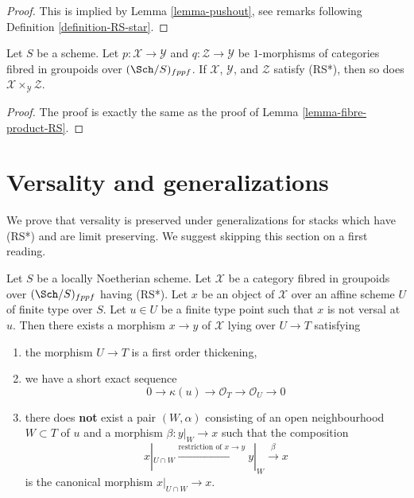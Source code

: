\begin{proof}
This is implied by Lemma \ref{lemma-pushout}, see
remarks following Definition \ref{definition-RS-star}.
\end{proof}

\begin{lemma}
\label{lemma-fibre-product-RS-star}
Let $S$ be a scheme. Let $p : \mathcal{X} \to \mathcal{Y}$ and
$q : \mathcal{Z} \to \mathcal{Y}$ be $1$-morphisms of categories
fibred in groupoids over $(\Sch/S)_{fppf}$. If $\mathcal{X}$, $\mathcal{Y}$,
and $\mathcal{Z}$ satisfy (RS*), then so
does $\mathcal{X} \times_\mathcal{Y} \mathcal{Z}$.
\end{lemma}

\begin{proof}
The proof is exactly the same as the proof of
Lemma \ref{lemma-fibre-product-RS}.
\end{proof}








\section{Versality and generalizations}
\label{section-generalize-versality}

\noindent
We prove that versality is preserved under generalizations
for stacks which have (RS*) and are limit preserving.
We suggest skipping this section on a first reading.

\begin{lemma}
\label{lemma-single-point}
Let $S$ be a locally Noetherian scheme. Let $\mathcal{X}$ be a category
fibred in groupoids over $(\Sch/S)_{fppf}$ having (RS*).
Let $x$ be an object of $\mathcal{X}$ over an affine scheme $U$
of finite type over $S$. Let $u \in U$ be a finite type point such that
$x$ is not versal at $u$. Then there exists a morphism $x \to y$
of $\mathcal{X}$ lying over $U \to T$ satisfying
\begin{enumerate}
\item the morphism $U \to T$ is a first order thickening,
\item we have a short exact sequence
$$
0 \to \kappa(u) \to \mathcal{O}_T \to \mathcal{O}_U \to 0
$$
\item there does {\bf not} exist a pair $(W, \alpha)$
consisting of an open neighbourhood $W \subset T$ of $u$
and a morphism $\beta : y|_W \to x$ such that the composition
$$
x|_{U \cap W} \xrightarrow{\text{restriction of }x \to y}
y|_W \xrightarrow{\beta} x
$$
is the canonical morphism $x|_{U \cap W} \to x$.
\end{enumerate}
\end{lemma}

